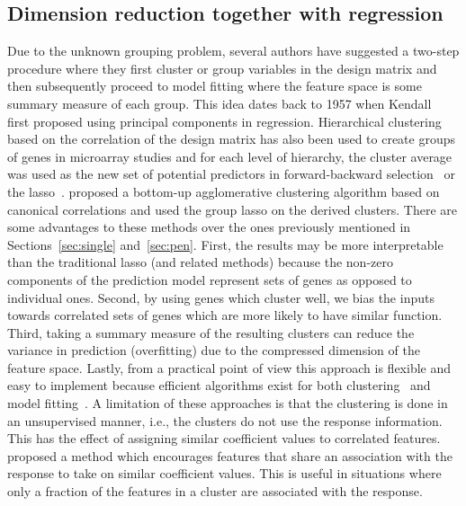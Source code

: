 \subsection{Dimension reduction together with regression}
Due to the unknown grouping problem, several authors have suggested a two-step procedure where they first cluster or group variables in the design matrix and then subsequently proceed to model fitting where the feature space is some summary measure of each group. 
This idea dates back to 1957 when Kendall~\citep{kendall1975multivariate} first proposed using principal components in regression. 
Hierarchical clustering based on the correlation of the design matrix has also been used to create groups of genes in microarray studies and for each level of hierarchy, the cluster average was used as the new set of potential predictors in forward-backward selection~\citep{hastie2001supervised} or the lasso~\citep{park2007averaged}.
\cite{buhlmann2013correlated} proposed a bottom-up agglomerative clustering algorithm based on canonical correlations and used the group lasso on the derived clusters. 
There are some advantages to these methods over the ones previously mentioned in Sections~\ref{sec:single} and~\ref{sec:pen}. 
First, the results may be more interpretable than the traditional lasso (and related methods) because the non-zero components of the prediction model represent sets of genes as opposed to individual ones. 
Second, by using genes which cluster well, we bias the inputs towards correlated sets of genes which are more likely to have similar function. 
Third, taking a summary measure of the resulting clusters can reduce the variance in prediction (overfitting) due to the compressed dimension of the feature space. 
Lastly, from a practical point of view this approach is flexible and easy to implement because efficient algorithms exist for both clustering~\citep{fastclust} and model fitting~\citep{friedman2010regularization,gglasso}. 
A limitation of these approaches is that the clustering is done in an unsupervised manner, i.e., the clusters do not use the response information. 
This has the effect of assigning similar coefficient values to correlated features. 
\cite{witten2014cluster} proposed a method which encourages features that share an association with the response to take on similar coefficient values. 
This is useful in situations where only a fraction of the features in a cluster are associated with the response. 







